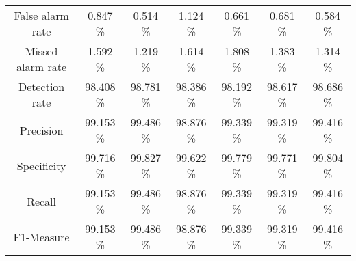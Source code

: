 \begin{table}[htb]
\begin{tabular}{@{}ccccccc@{}}
        False alarm rate &  0.847 \% &  0.514 \% &  1.124 \% &  0.661 \% &  0.681 \% &  0.584 \% \\
        Missed alarm rate &  1.592 \% &  1.219 \% &  1.614 \% &  1.808 \% &  1.383 \% &  1.314 \% \\
        Detection rate &  98.408 \% &  98.781 \% &  98.386 \% &  98.192 \% &  98.617 \% &  98.686 \% \\
        Precision &  99.153 \% &  99.486 \% &  98.876 \% &  99.339 \% &  99.319 \% &  99.416 \% \\
        Specificity &  99.716 \% &  99.827 \% &  99.622 \% &  99.779 \% &  99.771 \% &  99.804 \% \\
        Recall &  99.153 \% &  99.486 \% &  98.876 \% &  99.339 \% &  99.319 \% &  99.416 \% \\
        F1-Measure &  99.153 \% &  99.486 \% &  98.876 \% &  99.339 \% &  99.319 \% &  99.416 \% \\
        \bottomrule
    \end{tabular}
\end{table}